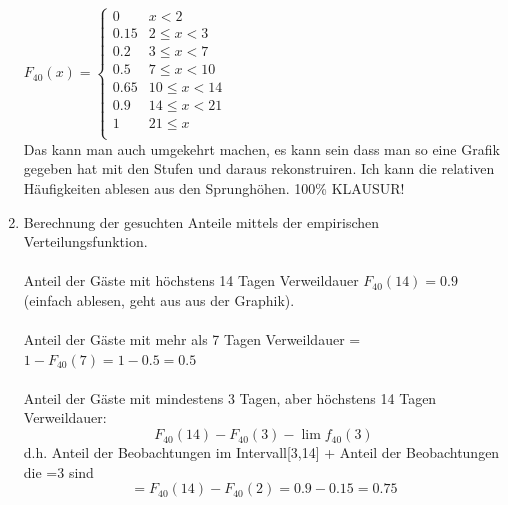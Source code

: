 \documentclass[10pt,a4paper]{article}
\begin{document}
\begin{enumerate}[label=(\alph*)]
	$F_{40}(x)= 
	\begin{cases}
		0 & x<2\\
		0.15 & 2\leq x <3\\
		0.2 & 3\leq x < 7\\
		0.5 & 7 \leq x <10\\
		0.65 & 10 \leq x <14\\
		0.9 & 14 \leq x < 21\\
		1 & 21 \leq x\\
	\end{cases}$\\
	Das kann man auch umgekehrt machen, es kann sein dass man so eine Grafik gegeben hat mit den Stufen und daraus rekonstruiren. Ich kann die relativen Häufigkeiten ablesen aus den Sprunghöhen. 100\% KLAUSUR!
	\item Berechnung der gesuchten Anteile mittels der empirischen Verteilungsfunktion. \\~\\Anteil der Gäste mit höchstens 14 Tagen Verweildauer $F_{40}(14)=0.9$ (einfach ablesen, geht aus aus der Graphik).\\~\\
	Anteil der Gäste mit mehr als 7 Tagen Verweildauer = $1-F_{40}(7)= 1-0.5=0.5$\\~\\
	Anteil der Gäste mit mindestens 3 Tagen, aber höchstens 14 Tagen Verweildauer: $$F_{40}(14)-F_{40}(3)-\lim f_{40}(3)$$ d.h. Anteil der Beobachtungen im Intervall[3,14] + Anteil der Beobachtungen die =3 sind
	$$= F_{40}(14)-F_{40}(2) = 0.9-0.15 = 0.75 $$
	

\end{enumerate}
\end{document}
